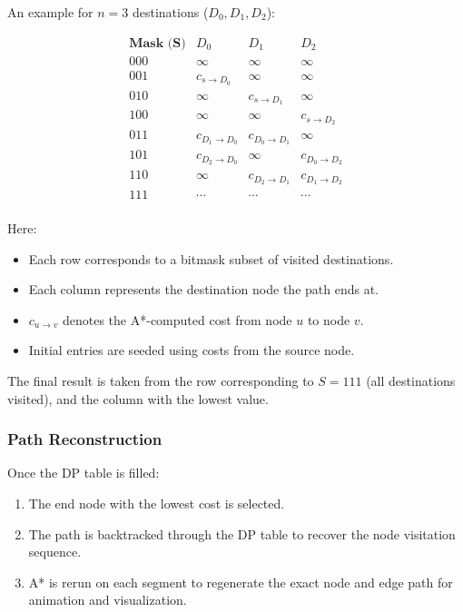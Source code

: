 \documentclass[12pt]{article}
\begin{document}
\vspace{1em}

An example for \( n = 3 \) destinations (\( D_0, D_1, D_2 \)):

\[
\begin{array}{c|ccc}
\textbf{Mask (S)} & D_0 & D_1 & D_2 \\
\hline
000 & \infty & \infty & \infty \\
001 & c_{s \rightarrow D_0} & \infty & \infty \\
010 & \infty & c_{s \rightarrow D_1} & \infty \\
100 & \infty & \infty & c_{s \rightarrow D_2} \\
011 & c_{D_1 \rightarrow D_0} & c_{D_0 \rightarrow D_1} & \infty \\
101 & c_{D_2 \rightarrow D_0} & \infty & c_{D_0 \rightarrow D_2} \\
110 & \infty & c_{D_2 \rightarrow D_1} & c_{D_1 \rightarrow D_2} \\
111 & \cdots & \cdots & \cdots \\
\end{array}
\]

Here:
\begin{itemize}
    \item Each row corresponds to a bitmask subset of visited destinations.
    \item Each column represents the destination node the path ends at.
    \item \( c_{u \rightarrow v} \) denotes the A*-computed cost from node \( u \) to node \( v \).
    \item Initial entries are seeded using costs from the source node.
\end{itemize}

The final result is taken from the row corresponding to \( S = 111 \) (all destinations visited), and the column with the lowest value.


\subsubsection*{Path Reconstruction}

Once the DP table is filled:
\begin{enumerate}
    \item The end node with the lowest cost is selected.
    \item The path is backtracked through the DP table to recover the node visitation sequence.
    \item A* is rerun on each segment to regenerate the exact node and edge path for animation and visualization.
\end{enumerate}
\end{document}
